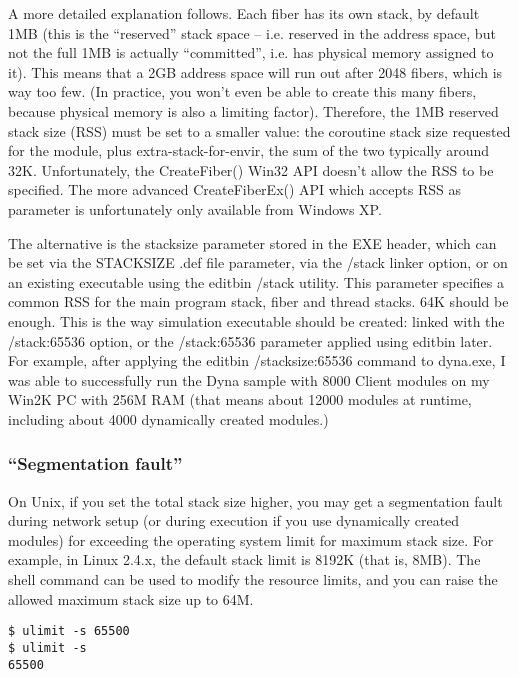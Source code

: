 A more detailed explanation follows.
Each fiber has its own stack, by default 1MB (this is the ``reserved''
stack space -- i.e. reserved in the address space, but not the full
1MB is actually ``committed'', i.e. has physical memory assigned to it).
This means that a 2GB address space will run out after 2048 fibers,
which is way too few. (In practice, you won't even be able to create
this many fibers, because physical memory is also a limiting factor).
Therefore, the 1MB reserved stack size (RSS) must be set to a smaller
value: the coroutine stack size requested for the module, plus
extra-stack-for-envir, the sum of the two typically around 32K.
Unfortunately, the CreateFiber() Win32 API doesn't allow the RSS to be
specified. The more advanced CreateFiberEx() API which accepts RSS as
parameter is unfortunately only available from Windows XP.

The alternative is the stacksize parameter stored in the EXE header,
which can be set
via the STACKSIZE .def file parameter, via the /stack linker option,
or on an existing executable using the editbin /stack utility.
This parameter specifies a common RSS for the main program stack,
fiber and thread stacks. 64K should be enough. This is the way
simulation executable should be created: linked with the /stack:65536
option, or the /stack:65536 parameter applied using editbin later.
For example, after applying the editbin /stacksize:65536 command to
dyna.exe, I was able to successfully run the Dyna sample with 8000
Client modules on my Win2K PC with 256M RAM (that means about 12000
modules at runtime, including about 4000 dynamically created modules.)


\subsubsection{``Segmentation fault''}

On Unix, if you set the total stack size higher, you may get a
segmentation fault during network setup (or
during execution if you use dynamically created modules) for exceeding
the operating system limit for maximum stack size. For example, in
Linux 2.4.x, the default stack limit is 8192K (that is, 8MB). The
 shell command can be used to modify the
resource limits, and you can raise the allowed maximum stack size
up to 64M.

\begin{verbatim}
$ ulimit -s 65500
$ ulimit -s
65500
\end{verbatim}

